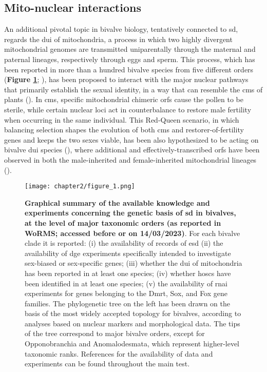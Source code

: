 \documentclass[../main.tex]{subfiles}
\begin{document}
\subsection{Mito-nuclear interactions}
An additional pivotal topic in bivalve biology, tentatively connected to \gls{sd}, regards the \gls{dui} of mitochondria, a process in which two highly divergent mitochondrial genomes are transmitted uniparentally through the maternal and paternal lineages, respectively through eggs and sperm. This process, which has been reported in more than a hundred bivalve species from five different orders (\textbf{Figure \ref{fig:summarySex}}; \textbf{\cite{gusman2016pursuing,capt2020unorthodox}}), has been proposed to interact with the major nuclear pathways that primarily establish the sexual identity, in a way that can resemble the \gls{cms} of plants (\textbf{\cite{ghiselli2013structure,breton2022did}}). In \gls{cms}, specific mitochondrial chimeric \glspl{orf} cause the pollen to be sterile, while certain nuclear loci act in counterbalance to restore male fertility when occurring in the same individual. This Red-Queen scenario, in which balancing selection shapes the evolution of both \gls{cms} and restorer-of-fertility genes and keeps the two sexes viable, has been also hypothesized to be acting on bivalve \gls{dui} species (\textbf{\cite{ghiselli2013structure,xu2022lack}}), where additional and effectively-transcribed \glspl{orf} have been observed in both the male-inherited and female-inherited mitochondrial lineages (\textbf{\cite{milani2013nuclear,milani2014paternally}}).

\begin{figure}
    \centering
    \texttt{[image: chapter2/figure\_1.png]}
    \captionsetup{width=\textwidth}
    \caption{
    \textbf{Graphical summary of the available knowledge and experiments concerning the genetic basis of \gls{sd} in bivalves, at the level of major taxonomic orders (as reported in WoRMS; accessed before or on 14/03/2023)}. For each bivalve clade it is reported: (i) the availability of records of \gls{esd} (ii) the availability of \gls{dge} experiments specifically intended to investigate sex-biased or sex-specific genes; (iii) whether the \gls{dui} of mitochondria has been reported in at least one species; (iv) whether \glspl{hosc} have been identified in at least one species; (v) the availability of \gls{rnai} experiments for genes belonging to the Dmrt, Sox, and Fox gene families. The phylogenetic tree on the left has been drawn on the basis of the most widely accepted topology for bivalves, according to analyses based on nuclear markers and morphological data. The tips of the tree correspond to major bivalve orders, except for Opponobranchia and Anomalodesmata, which represent higher-level taxonomic ranks. References for the availability of data and experiments can be found throughout the main test.
    }
    \label{fig:summarySex}
\end{figure}
\end{document}
